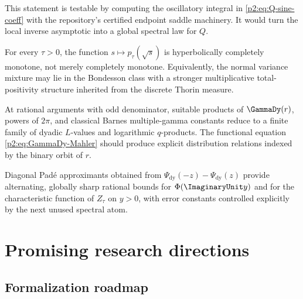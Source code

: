 \documentclass[11pt]{article}
\theoremstyle{definition}
\theoremstyle{remark}
\begin{document}
This statement is testable by computing the oscillatory integral in
\eqref{p2:eq:Q-sine-coeff} with the repository's certified endpoint saddle machinery.  It would
turn the local inverse asymptotic into a global spectral law for $Q$.

\begin{conjecture}
For every $\tau>0$, the function $s\mapsto p_\tau(\sqrt s)$ is hyperbolically completely
monotone, not merely completely monotone.  Equivalently, the normal variance mixture may lie
in the Bondesson class with a stronger multiplicative total-positivity structure inherited
from the discrete Thorin measure.
\end{conjecture}

\begin{conjecture}
At rational arguments with odd denominator, suitable products of
$\GammaDy(r)$, powers of $2\pi$, and classical Barnes multiple-gamma constants reduce to a
finite family of dyadic $L$-values and logarithmic $q$-products.  The functional equation
\eqref{p2:eq:GammaDy-Mahler} should produce explicit distribution relations indexed by the
binary orbit of $r$.
\end{conjecture}

\begin{conjecture}
Diagonal Pad\'e approximants obtained from
\(
 \Psi_{\mathrm{dy}}(-z)-\Psi_{\mathrm{dy}}(z)
\)
provide alternating, globally sharp rational bounds for $\Phi(\ImaginaryUnit y)$ and for the
characteristic function of $Z_\tau$ on $y>0$, with error constants controlled explicitly by
the next unused spectral atom.
\end{conjecture}

\section{Promising research directions}
\label{p2:sec:future}

\subsection{Formalization roadmap}
\end{document}
